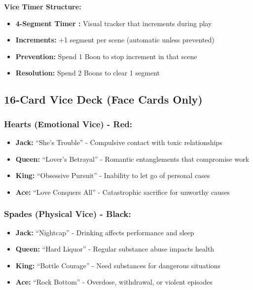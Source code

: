 \documentclass[11pt]{article}
\begin{document}
\textbf{Vice Timer Structure:}
\begin{itemize}
    \item \textbf{4-Segment Timer :} Visual tracker that increments during play
    \item \textbf{Increments:} +1 segment per scene (automatic unless prevented)
    \item \textbf{Prevention:} Spend 1 Boon to stop increment in that scene
    \item \textbf{Resolution:} Spend 2 Boons to clear 1 segment
\end{itemize}

\subsection{16-Card Vice Deck (Face Cards Only)}

\subsubsection{Hearts (Emotional Vice) - Red:}
\begin{itemize}
    \item \textbf{Jack:} ``She's Trouble'' - Compulsive contact with toxic relationships
    \item \textbf{Queen:} ``Lover's Betrayal'' - Romantic entanglements that compromise work
    \item \textbf{King:} ``Obsessive Pursuit'' - Inability to let go of personal cases
    \item \textbf{Ace:} ``Love Conquers All'' - Catastrophic sacrifice for unworthy causes
\end{itemize}

\subsubsection{Spades (Physical Vice) - Black:}
\begin{itemize}
    \item \textbf{Jack:} ``Nightcap'' - Drinking affects performance and sleep
    \item \textbf{Queen:} ``Hard Liquor'' - Regular substance abuse impacts health
    \item \textbf{King:} ``Bottle Courage'' - Need substances for dangerous situations
    \item \textbf{Ace:} ``Rock Bottom'' - Overdose, withdrawal, or violent episodes
\end{itemize}
\end{document}
